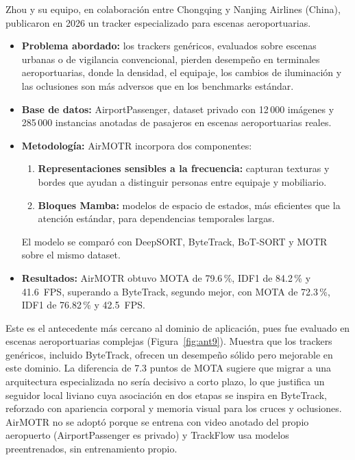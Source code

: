 \documentclass[12pt,a4paper]{article}
\begin{document}
Zhou y su equipo, en colaboración entre Chongqing y Nanjing Airlines
(China), publicaron en 2026 un tracker especializado para escenas
aeroportuarias.

\begin{itemize}
    \item \textbf{Problema abordado:} los trackers genéricos, evaluados
    sobre escenas urbanas o de vigilancia convencional, pierden
    desempeño en terminales aeroportuarias, donde la densidad, el
    equipaje, los cambios de iluminación y las oclusiones son más
    adversos que en los benchmarks estándar.

    \item \textbf{Base de datos:} AirportPassenger, dataset privado con
    12\,000 imágenes y 285\,000 instancias anotadas de pasajeros en
    escenas aeroportuarias reales.

    \item \textbf{Metodología:} AirMOTR incorpora dos componentes:
    \begin{enumerate}
        \item \textbf{Representaciones sensibles a la frecuencia:}
        capturan texturas y bordes que ayudan a distinguir personas entre
        equipaje y mobiliario.
        \item \textbf{Bloques Mamba:} modelos de espacio de estados, más
        eficientes que la atención estándar, para dependencias temporales
        largas.
    \end{enumerate}
    El modelo se comparó con DeepSORT, ByteTrack, BoT-SORT y MOTR sobre
    el mismo dataset.

    \item \textbf{Resultados:} AirMOTR obtuvo MOTA de 79.6\,\%, IDF1 de
    84.2\,\% y 41.6~FPS, superando a ByteTrack, segundo mejor, con MOTA
    de 72.3\,\%, IDF1 de 76.82\,\% y 42.5~FPS.
\end{itemize}

Este es el antecedente más cercano al dominio de aplicación, pues fue
evaluado en escenas aeroportuarias complejas (Figura~\ref{fig:ant9}).
Muestra que los trackers
genéricos, incluido ByteTrack, ofrecen un desempeño sólido pero
mejorable en este dominio. La diferencia de 7.3 puntos de MOTA sugiere
que migrar a una arquitectura especializada no sería decisivo a corto
plazo, lo que justifica un seguidor local liviano cuya asociación en dos
etapas se inspira en ByteTrack, reforzado con apariencia corporal y
memoria visual para los cruces y oclusiones. AirMOTR no se adoptó
porque se entrena con video anotado del propio aeropuerto (AirportPassenger
es privado) y TrackFlow usa modelos preentrenados, sin entrenamiento
propio.
\end{document}
